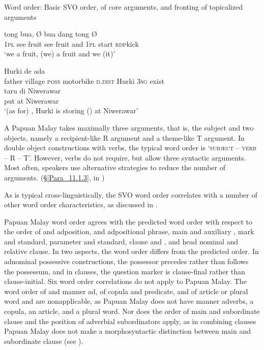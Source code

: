 \begin{styleExampleTitle}
{Word order: Basic SVO order,  of core arguments, and fronting of topicalized arguments}
\end{styleExampleTitle}
\ea
\label{Example_1.3}
\gll tong  bua, Ø  bua dang tong   Ø\\ %
 \textsc{1pl}  see fruit { } see fruit and \textsc{1pl} start  \textsc{rdp}{\Tilde}kick \\

\glt 
‘we  a fruit, (we)  a fruit and we  (it)’ \textstyleExampleSource{[081006-014-Cv.0001]}
\z

\ea
\label{Example_1.4}
\gll {}     Hurki de ada\\ %
 father village \textsc{poss} motorbike \textsc{d.dist} Hurki \textsc{3sg} exist\\
\gll taru  di Niwerawar\\
 put { } at Niwerawar\\
\glt  ‘(as for) , Hurki is storing () at Niwerawar’ \textstyleExampleSource{[081014-003-Cv.0024]}
\z

A Papuan Malay  takes maximally three arguments, that is, the subject and two objects, namely a recipient-like R argument and a theme-like T argument. In double object constructions with  verbs, the typical word order is ‘\textsc{subject} – \textsc{verb} – R – T’. However,  verbs do not require, but allow three syntactic arguments. Most often, speakers use alternative strategies to reduce the number of arguments. (§\ref{Para_11.1.3}, in )



As is typical cross-linguistically, the SVO word order correlates with a number of other word order characteristics, as discussed in \citet{Dryer.2007c}.



Papuan Malay word order agrees with the predicted word order with respect to the order of  and adposition,  and adpositional phrase, main  and auxiliary , mark and standard, parameter and standard, clause and , and head nominal and relative clause. In two aspects, the word order differs from the predicted order. In adnominal possessive constructions, the possessor precedes rather than follows the possessum, and in  clauses, the question marker is clause-final rather than clause-initial. Six word order correlations do not apply to Papuan Malay. The word order of  and manner ad, of copula and predicate, and of article or plural word and  are nonapplicable, as Papuan Malay does not have manner adverbs, a copula, an article, and a plural word. Nor does the order of main and subordinate clause and the position of adverbial subordinators apply, as in combining clauses Papuan Malay does not make a morphosyntactic distinction between main and subordinate clause (see ).


